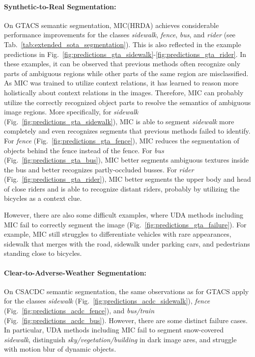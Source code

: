 \documentclass[10pt,twocolumn,letterpaper]{article}
\begin{document}
\paragraph{Synthetic-to-Real Segmentation:}
On GTACS semantic segmentation, MIC(HRDA) achieves considerable performance improvements for the classes \emph{sidewalk}, \emph{fence}, \emph{bus}, and \emph{rider} (see Tab.~\ref{tab:extended_sota_segmentation}). This is also reflected in the example predictions in Fig.~\ref{fig:predictions_gta_sidewalk}-\ref{fig:predictions_gta_rider}. 
In these examples, it can be observed that previous methods often recognize only parts of ambiguous regions while other parts of the same region are misclassified. 
As MIC was trained to utilize context relations, it has learned to reason more holistically about context relations in the images. Therefore, MIC can probably utilize the correctly recognized object parts to resolve the semantics of ambiguous image regions.
More specifically, for \emph{sidewalk} (Fig.~\ref{fig:predictions_gta_sidewalk}), MIC is able to segment \emph{sidewalk} more completely and even recognizes segments that previous methods failed to identify. For \emph{fence} (Fig.~\ref{fig:predictions_gta_fence}), MIC reduces the segmentation of objects behind the fence instead of the fence. For \emph{bus} (Fig.~\ref{fig:predictions_gta_bus}), MIC better segments ambiguous textures inside the bus and better recognizes partly-occluded busses. For \emph{rider} (Fig.~\ref{fig:predictions_gta_rider}), MIC better segments the upper body and head of close riders and is able to recognize distant riders, probably by utilizing the bicycles as a context clue.

However, there are also some difficult examples, where UDA methods including MIC fail to correctly segment the image (Fig.~\ref{fig:predictions_gta_failure}). For example, MIC still struggles to differentiate vehicles with rare appearances, sidewalk that merges with the road, sidewalk under parking cars, and pedestrians standing close to bicycles.

\paragraph{Clear-to-Adverse-Weather Segmentation:}
On CS\allowbreak ACDC semantic segmentation, the same observations as for GTACS apply for the classes \emph{sidewalk} (Fig.~\ref{fig:predictions_acdc_sidewalk}), \emph{fence} (Fig.~\ref{fig:predictions_acdc_fence}), and \emph{bus/train} (Fig.~\ref{fig:predictions_acdc_bus}). However, there are some distinct failure cases. In particular, UDA methods including MIC fail to segment snow-covered \emph{sidewalk}, distinguish \emph{sky/vegetation/building} in dark image ares, and struggle with motion blur of dynamic objects.
\end{document}
